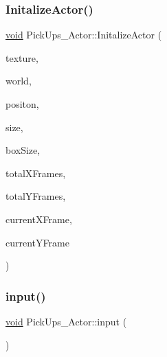\mbox{\label{classPickUps__Actor_a0e2fa168ce8586fcc4f69a2ff824c801}} 
\subsubsection{\texorpdfstring{Initalize\+Actor()}{InitalizeActor()}\hspace{0.1cm}{\footnotesize\ttfamily [2/2]}}
{\footnotesize\ttfamily \hyperlink{imgui__impl__opengl3__loader_8h_ac668e7cffd9e2e9cfee428b9b2f34fa7}{void} Pick\+Ups\+\_\+\+Actor\+::\+Initalize\+Actor (\begin{DoxyParamCaption}\item[{\hyperlink{classTexture__Actor}{Texture\+\_\+\+Actor} $\ast$}]{texture,  }\item[{b2\+World $\ast$}]{world,  }\item[{glm\+::vec2}]{positon,  }\item[{glm\+::vec2}]{size,  }\item[{glm\+::vec2}]{box\+Size,  }\item[{int}]{total\+X\+Frames,  }\item[{int}]{total\+Y\+Frames,  }\item[{int}]{current\+X\+Frame,  }\item[{int}]{current\+Y\+Frame }\end{DoxyParamCaption})}

\mbox{\label{classPickUps__Actor_aacd9aee15846715f30259aba89a5d83f}} 
\subsubsection{\texorpdfstring{input()}{input()}}
{\footnotesize\ttfamily \hyperlink{imgui__impl__opengl3__loader_8h_ac668e7cffd9e2e9cfee428b9b2f34fa7}{void} Pick\+Ups\+\_\+\+Actor\+::input (\begin{DoxyParamCaption}{ }\end{DoxyParamCaption})}

\mbox{\label{classPickUps__Actor_aec7751b6c40d081160740669a59af7bb}} 
